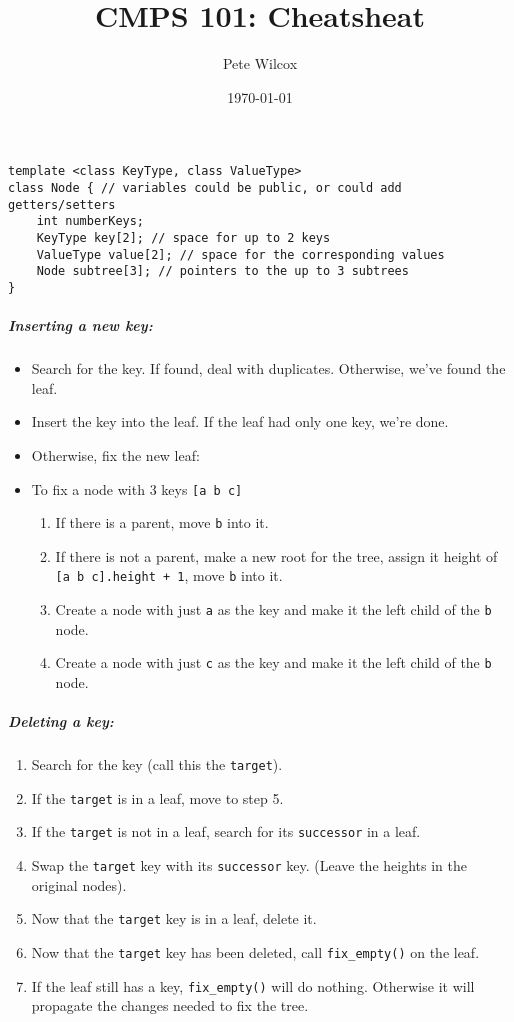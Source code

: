 \documentclass{article}
\title{CMPS 101: Cheatsheat}
\author{Pete Wilcox}
\date\today
\newcommand{\code}[1]{\texttt{#1}}
\begin{document}
\begin{lstlisting}[frame=single,basicstyle=\footnotesize\ttfamily]
template <class KeyType, class ValueType>
class Node { // variables could be public, or could add getters/setters
    int numberKeys;
    KeyType key[2]; // space for up to 2 keys
    ValueType value[2]; // space for the corresponding values
    Node subtree[3]; // pointers to the up to 3 subtrees
}
\end{lstlisting}

\subparagraph{Inserting a new key:}
\begin{itemize}[noitemsep]
    \item Search for the key. If found, deal with duplicates. Otherwise, we've found the leaf.
    \item Insert the key into the leaf. If the leaf had only one key, we're done.
    \item Otherwise, fix the new leaf:
    \item To fix a node with 3 keys \code{[a b c]} 
    \begin{enumerate}[noitemsep]
        \item If there is a parent, move \code{b} into it.
        \item If there is not a parent, make a new root for the tree, assign it height of \code{[a b c].height + 1}, move \code{b} into it.
        \item Create a node with just \code{a} as the key and make it the left child of the \code{b} node.
        \item Create a node with just \code{c} as the key and make it the left child of the \code{b} node.
    \end{enumerate}
\end{itemize}

\subparagraph{Deleting a key: }
\begin{enumerate}[noitemsep]
    \item Search for the key (call this the \code{target}).
    \item If the \code{target} is in a leaf, move to step 5.
    \item If the \code{target} is not in a leaf, search for its \code{successor} in a leaf.
    \item Swap the \code{target} key with its \code{successor} key. (Leave the heights in the original nodes).
    \item Now that the \code{target} key is in a leaf, delete it.
    \item Now that the \code{target} key has been deleted, call \code{fix\_empty()} on the leaf.
    \item If the leaf still has a key, \code{fix\_empty()} will do nothing. Otherwise it will propagate the changes needed to fix the tree.
\end{enumerate}
\end{document}
